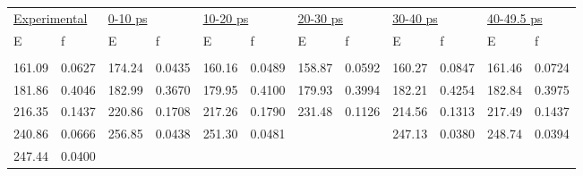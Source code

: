 \documentclass[
journal=jpcbfk, %
manuscript=article]{achemso}
\begin{document}
\begin{table}[ht]
\begin{tabular}[l]{llllllllllll}
				\multicolumn{2}{l}{\underline{Experimental}} &
				\multicolumn{2}{l}{\underline{0-10 ps}} &
				\multicolumn{2}{l}{\underline{10-20 ps}} &
				\multicolumn{2}{l}{\underline{20-30 ps}} &
				\multicolumn{2}{l}{\underline{30-40 ps}} &
				\multicolumn{2}{l}{\underline{40-49.5 ps}} \\ [1ex]
				E    & f    & E    & f    & E    & f    & E    & f    & E    & f    & E    & f  \\ [0.5ex]
				\hline\hline
				\\[-0.5ex]
				161.09	&	0.0627	&	174.24	&	0.0435	&	160.16	&	0.0489	&	158.87	&	0.0592	&	160.27	&	0.0847	&	161.46	&	0.0724 \\
				181.86	&	0.4046	&	182.99	&	0.3670	&	179.95	&	0.4100	&	179.93	&	0.3994	&	182.21	&	0.4254	&	182.84	&	0.3975 \\
				216.35	&	0.1437	&	220.86	&	0.1708	&	217.26	&	0.1790	&	231.48	&	0.1126	&	214.56	&	0.1313	&	217.49	&	0.1437 \\
				240.86	&	0.0666	&	256.85	&	0.0438	&	251.30	&	0.0481	&	~	&	~	&	247.13	&	0.0380	&	248.74	&	0.0394 \\
				247.44	&	0.0400	&	~	&	~	&	~	&	~	&	~	&	~	&	~	&	~	&	~	&	~ \\
				\end{tabular}
				\end{table}
				
				\pagebreak
				
\end{document}
